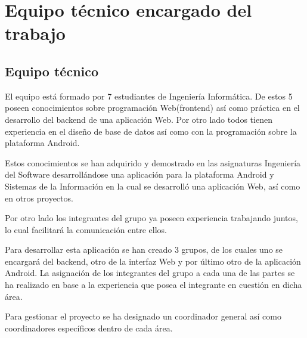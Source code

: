 
\chapter{Equipo t\'ecnico encargado del trabajo} %

\label{Chapter5} %


\section{Equipo t\'ecnico}

El equipo está formado por 7 estudiantes de Ingeniería Informática. De estos 5 poseen conocimientos sobre programación Web(frontend) así como práctica en el desarrollo del backend de una aplicación Web. Por otro lado todos tienen experiencia en el diseño de base de datos  así como con la programación sobre la plataforma Android. 

Estos conocimientos se han adquirido y demostrado en las asignaturas Ingeniería del Software desarrollándose una aplicación para la plataforma Android y Sistemas de la Información en la cual  se desarrolló una aplicación Web, así como en otros proyectos. 

Por otro lado los integrantes del grupo ya poseen experiencia trabajando juntos, lo cual facilitará la comunicación entre ellos. 

Para desarrollar esta aplicación se han creado 3 grupos, de los cuales uno se encargará del backend, otro de la interfaz Web y por último otro de la aplicación Android. La asignación de los integrantes del grupo a cada una de las partes se ha realizado en base a la experiencia que posea el integrante en cuestión en dicha área.

Para gestionar el proyecto se ha designado un coordinador general así como coordinadores específicos dentro de cada área.
